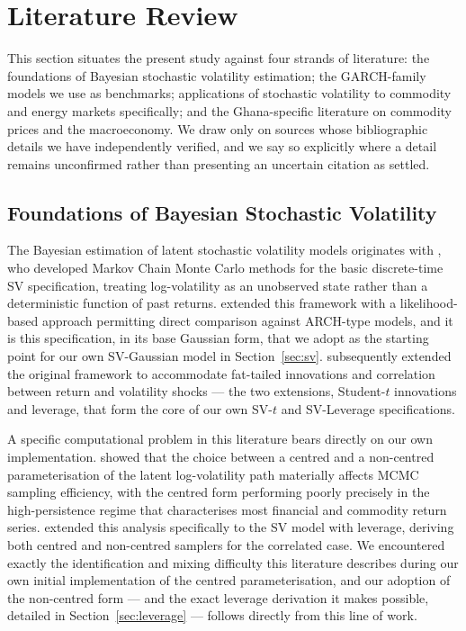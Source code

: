 \documentclass[preprint,12pt,authoryear]{elsarticle}
\begin{document}
\section{Literature Review}
\label{sec:literature}

This section situates the present study against four strands of literature: the foundations of Bayesian stochastic volatility estimation; the GARCH-family models we use as benchmarks; applications of stochastic volatility to commodity and energy markets specifically; and the Ghana-specific literature on commodity prices and the macroeconomy. We draw only on sources whose bibliographic details we have independently verified, and we say so explicitly where a detail remains unconfirmed rather than presenting an uncertain citation as settled.

\subsection{Foundations of Bayesian Stochastic Volatility}

The Bayesian estimation of latent stochastic volatility models originates with \citet{jacquierpolsonrossi1994}, who developed Markov Chain Monte Carlo methods for the basic discrete-time SV specification, treating log-volatility as an unobserved state rather than a deterministic function of past returns. \citet{kimshephardchib1998} extended this framework with a likelihood-based approach permitting direct comparison against ARCH-type models, and it is this specification, in its base Gaussian form, that we adopt as the starting point for our own SV-Gaussian model in Section~\ref{sec:sv}. \citet{jacquierpolsonrossi2004} subsequently extended the original framework to accommodate fat-tailed innovations and correlation between return and volatility shocks --- the two extensions, Student-$t$ innovations and leverage, that form the core of our own SV-$t$ and SV-Leverage specifications.

A specific computational problem in this literature bears directly on our own implementation. \citet{kastnerfruhwirthschnatter2014} showed that the choice between a centred and a non-centred parameterisation of the latent log-volatility path materially affects MCMC sampling efficiency, with the centred form performing poorly precisely in the high-persistence regime that characterises most financial and commodity return series. \citet{hosszejnikastner2019} extended this analysis specifically to the SV model with leverage, deriving both centred and non-centred samplers for the correlated case. We encountered exactly the identification and mixing difficulty this literature describes during our own initial implementation of the centred parameterisation, and our adoption of the non-centred form --- and the exact leverage derivation it makes possible, detailed in Section~\ref{sec:leverage} --- follows directly from this line of work.
\end{document}
